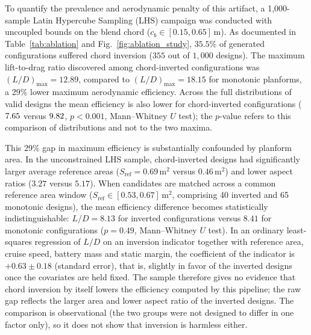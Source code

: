 To quantify the prevalence and aerodynamic penalty of this artifact, a 1,000-sample Latin Hypercube Sampling (LHS) campaign was conducted with uncoupled bounds on the blend chord ($c_{b} \in [0.15, 0.65]\,\mathrm{m}$). As documented in Table~\ref{tab:ablation} and Fig.~\ref{fig:ablation_study}, $35.5\%$ of generated configurations suffered chord inversion ($355$ out of $1{,}000$ designs). The maximum lift-to-drag ratio discovered among chord-inverted configurations was $(L/D)_{\max} = 12.89$, compared to $(L/D)_{\max} = 18.15$ for monotonic planforms, a 29\% lower maximum aerodynamic efficiency. Across the full distributions of valid designs the mean efficiency is also lower for chord-inverted configurations ($7.65$ versus $9.82$, $p < 0.001$, Mann--Whitney $U$ test); the $p$-value refers to this comparison of distributions and not to the two maxima.

\begin{table}[htbp]
\centering\small
\caption{Aerodynamic and geometric comparison from the 1,000-sample unconstrained chord ablation experiment.}
\label{tab:ablation}

\end{table}

This 29\% gap in maximum efficiency is substantially confounded by planform area. In the unconstrained LHS sample, chord-inverted designs had significantly larger average reference areas ($S_{\mathrm{ref}} = 0.69\,\mathrm{m}^2$ versus $0.46\,\mathrm{m}^2$) and lower aspect ratios ($3.27$ versus $5.17$). When candidates are matched across a common reference area window ($S_{\mathrm{ref}} \in [0.53, 0.67]\,\mathrm{m}^2$, comprising 40 inverted and 65 monotonic designs), the mean efficiency difference becomes statistically indistinguishable: $L/D = 8.13$ for inverted configurations versus $8.41$ for monotonic configurations ($p = 0.49$, Mann--Whitney $U$ test). In an ordinary least-squares regression of $L/D$ on an inversion indicator together with reference area, cruise speed, battery mass and static margin, the coefficient of the indicator is $+0.63 \pm 0.18$ (standard error), that is, slightly in favor of the inverted designs once the covariates are held fixed. The sample therefore gives no evidence that chord inversion by itself lowers the efficiency computed by this pipeline; the raw gap reflects the larger area and lower aspect ratio of the inverted designs. The comparison is observational (the two groups were not designed to differ in one factor only), so it does not show that inversion is harmless either.



